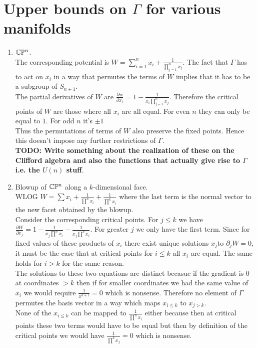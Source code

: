\documentclass[a4paper]{article}
\begin{document}
\section{Upper bounds on $\Gamma$ for various manifolds}
\begin{enumerate}
	\item $\mathbb{C}\mathbb{P}^{n}$.\\ The corresponding potential is $W=\sum_{i=1}^{n} x_{i} + \frac{1}{\prod_{j=1}^{n} x_{j} }$. The fact that $\Gamma$ has to act on $x_{i}$ in a way that permutes the terms of $W$ implies that it has to be a subgroup of $S_{n+1}$.\\
	The partial derivatives of $W$ are $\frac{\partial w}{\partial x_{i}} =1-\frac{1}{x_{i}\prod_{j=1}^{n}x_{j}}$. Therefore the critical points of $W$ are those where all  $x_{i}$ are all equal. For even $n$ they can only be equal to $1$. For odd $n$ it's $\pm 1$\\
	Thus the permutations of terms of $W$ also preserve the fixed points. Hence this doesn't impose any further restrictions of $\Gamma$.\\
	\textbf{TODO: Write something about the realization of these on the Clifford algebra and also the functions that actually give rise to $\Gamma$ i.e. the $U(n)$ stuff}.\\
	\item Blowup of $\mathbb{C}\mathbb{P}^{n}$ along a $k$-dimensional face.\\
	WLOG $W=\sum x_{i}+\frac{1}{\prod ^n x_{i}}+\frac{1}{\prod ^k x_{i}}$ where the last term is the normal vector to the new facet obtained by the blowup.\\
	Consider the corresponding critical points. For $j\le k$ we have $\frac{\partial W}{\partial x_{j}} =1-\frac{1}{x_{j}\prod^n x_{i}} - \frac{1}{x_{j}\prod^k x_{i}}$. For greater $j$ we only have the first term.
	Since for fixed values of these products of $x_{i}$ there exist unique solutions $x_{j}$to $\partial_j W=0$, it must be the case that at critical points for $i\le k$ all $x_{i}$     are equal. The same holds for $i>k$ for the same reason. \\
	The solutions to these two equations are distinct becasue if the gradient is 0 at coordinates $>  k$ then if for smaller coordinates we had the same value of  $x_{i}$ we would require $\frac{1}{x^{k+1}}=0$ which is nonsense. Therefore  no element of $\Gamma $ permutes the basis vector in a way which maps $x_{i\le k}$ to $x_{j>k}$.\\
	None of the $x_{i\le k}$ can be mapped to $\frac{1}{\prod^n x_{i}}$ either because then at critical points these two terms would have to be equal but then by definition of the critical points we would have $\frac{1}{\prod^{k}x_{j}}=0$ which is nonsense.\\

\end{enumerate}
\end{document}
